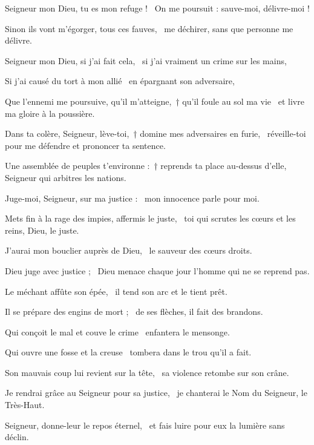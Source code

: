 \item Seigneur mon Dieu, tu es mon refuge !~\psstar{} On me poursuit : sauve-moi, délivre-moi !

\item Sinon ils vont m'égorger, tous ces fauves,~\psstar{} me déchirer, sans que personne me délivre.

\item Seigneur mon Dieu, si j'ai fait cela,~\psstar{} si j'ai vraiment un crime sur les mains,

\item Si j'ai causé du tort à mon allié~\psstar{} en épargnant son adversaire,

\item Que l'ennemi me poursuive, qu'il m'atteigne,~† qu'il foule au sol ma vie~\psstar{} et livre ma gloire à la poussière.

\item Dans ta colère, Seigneur, lève-toi,~† domine mes adversaires en furie,~\psstar{} réveille-toi pour me défendre et prononcer ta sentence.

\item Une assemblée de peuples t'environne :~† reprends ta place au-dessus d'elle, Seigneur qui arbitres les nations.

\item Juge-moi, Seigneur, sur ma justice :~\psstar{} mon innocence parle pour moi.

\item Mets fin à la rage des impies, affermis le juste,~\psstar{} toi qui scrutes les cœurs et les reins, Dieu, le juste.

\item J'aurai mon bouclier auprès de Dieu,~\psstar{} le sauveur des cœurs droits.

\item Dieu juge avec justice ;~\psstar{} Dieu menace chaque jour l'homme qui ne se reprend pas.

\item Le méchant affûte son épée,~\psstar{} il tend son arc et le tient prêt.

\item Il se prépare des engins de mort ;~\psstar{} de ses flèches, il fait des brandons.

\item Qui conçoit le mal et couve le crime~\psstar{} enfantera le mensonge.

\item Qui ouvre une fosse et la creuse~\psstar{} tombera dans le trou qu'il a fait.

\item Son mauvais coup lui revient sur la tête,~\psstar{} sa violence retombe sur son crâne.

\item Je rendrai grâce au Seigneur pour sa justice,~\psstar{} je chanterai le Nom du Seigneur, le Très-Haut.

\item Seigneur, donne-leur le repos éternel,~\psstar{} et fais luire pour eux la lumière sans déclin.